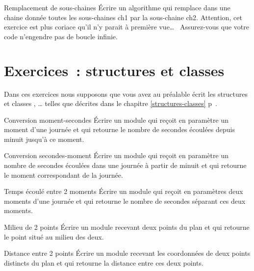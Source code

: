 \begin{Exercice}{Remplacement de sous-chaines}
	Écrire un algorithme 
	qui remplace dans une chaine donnée 
	toutes les sous-chaines ch1 par la sous-chaine ch2. 
	Attention, 
	cet exercice est plus coriace qu’il n’y parait à première vue\dots~
	Assurez-vous que votre code n’engendre pas de boucle infinie. 
\end{Exercice}	










\section{Exercices~: structures et classes}

Dans ces exercices nous supposons que vous avez au préalable écrit les
structures et classes , … telles que décrites dans le
chapitre \ref{structures-classes} p~\pageref{structures-classes}.

\begin{Exercice}{Conversion moment-secondes}
	Écrire un module qui reçoit en paramètre un
	moment d’une journée et qui retourne le nombre de secondes écoulées
	depuis minuit jusqu’à ce moment.
\end{Exercice}

\begin{Exercice}{Conversion secondes-moment}
	Écrire un module qui reçoit en paramètre un
	nombre de secondes écoulées dans une journée à partir de minuit et qui
	retourne le moment correspondant de la journée.
\end{Exercice}

\begin{Exercice}{Temps écoulé entre 2 moments}
	Écrire un module qui reçoit en paramètres deux
	moments d’une journée et qui retourne le nombre de secondes séparant
	ces deux moments.
\end{Exercice}

\begin{Exercice}{Milieu de 2 points}
	Écrire un module recevant deux points du plan 
	et qui retourne le point situé au milieu des deux.
\end{Exercice}

\begin{Exercice}{Distance entre 2 points}
	Écrire un module recevant les coordonnées de
	deux points distincts du plan et qui retourne
	la distance entre ces deux points.
\end{Exercice}

